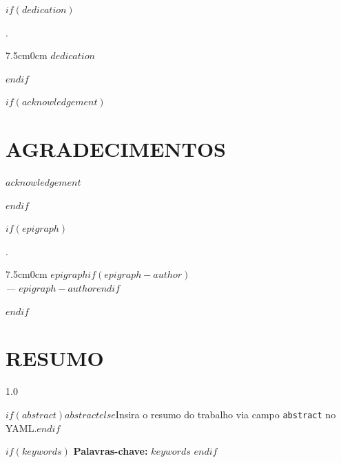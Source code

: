 $if(dedication)$
\begin{invisible}.\end{invisible}

\vspace{28\baselineskip}

\begin{adjustwidth}{7.5cm}{0cm}
    \justifying
    \singlespacing
    $dedication$
\end{adjustwidth}

\newpage
\pagestyle{fancy}
$endif$

\newcommand{\presec}{%
\titleformat{\section}[block]{\bfseries\filcenter}{}{1em}{}
}
\presec

$if(acknowledgement)$
\section*{AGRADECIMENTOS}
\justify

$acknowledgement$

\newpage
\pagestyle{fancy}
$endif$

$if(epigraph)$
\begin{invisible}.\end{invisible}
\vspace{28\baselineskip}

\begin{adjustwidth}{7.5cm}{0cm}
    \justifying
    \singlespacing
    \itshape
    $epigraph$$if(epigraph-author)$ \\[0.5em] \upshape --- $epigraph-author$$endif$
\end{adjustwidth}

\newpage
\pagestyle{fancy}
$endif$

\section*{RESUMO}

\begin{spacing}{1.0}
\justify

\setlength{\parindent}{0pt}

$if(abstract)$$abstract$$else$Insira o resumo do trabalho via campo \texttt{abstract} no YAML.$endif$

$if(keywords)$
\vspace{1em}
\textbf{Palavras-chave:} $keywords$
$endif$

\setlength{\parindent}{15pt}
\end{spacing}


